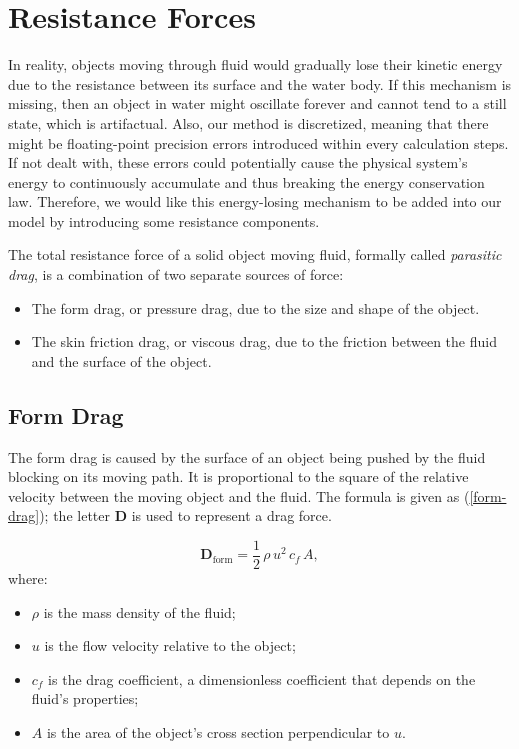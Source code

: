 \section{Resistance Forces}

In reality, objects moving through fluid would gradually lose their kinetic energy due to the resistance between its surface and the water body.
If this mechanism is missing, then an object in water might oscillate forever and cannot tend to a still state, which is artifactual.
Also, our method is discretized, meaning that there might be floating-point precision errors introduced within every calculation steps.
If not dealt with, these errors could potentially cause the physical system's energy to continuously accumulate and thus breaking the energy conservation law.
Therefore, we would like this energy-losing mechanism to be added into our model by introducing some resistance components.

The total resistance force of a solid object moving fluid, formally called \emph{parasitic drag}, is a combination of two separate sources of force:
\begin{itemize}
	\item The form drag, or pressure drag, due to the size and shape of the object.
	\item The skin friction drag, or viscous drag, due to the friction between the fluid and the surface of the object.
\end{itemize}

\subsection{Form Drag}

The form drag is caused by the surface of an object being pushed by the fluid blocking on its moving path.
It is proportional to the square of the relative velocity between the moving object and the fluid.
The formula is given as (\ref{form-drag}); the letter $\mathbf{D}$ is used to represent a drag force.

\begin{equation}
	\mathbf{D}_{\text{form}}=\frac{1}{2}\,\rho\,u^2\,c_f\,A,
	\label{form-drag}
\end{equation}
where:
\begin{itemize}
	\item $\rho$ is the mass density of the fluid;
	\item $u$ is the flow velocity relative to the object;
	\item $c_f$ is the drag coefficient, a dimensionless coefficient that depends on the fluid's properties;
	\item $A$ is the area of the object's cross section perpendicular to $u$.
\end{itemize}

